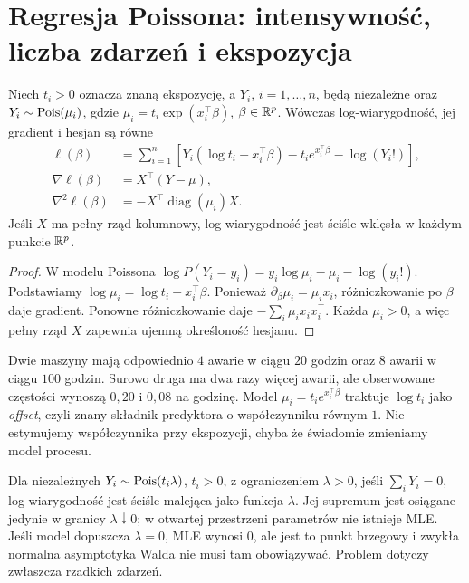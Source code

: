 \section{Regresja Poissona: intensywność, liczba zdarzeń i ekspozycja}
\begin{twierdzenie}
\label{thm:poisson-glm-score}
Niech $t_i>0$ oznacza znaną ekspozycję, a
$Y_i$, $i=1,\ldots,n$, będą niezależne oraz
$Y_i\sim\operatorname{Pois}(\mu_i)$, gdzie
$\mu_i=t_i\exp(x_i^\top\beta)$, $\beta\in\mathbb R^p$.
Wówczas log-wiarygodność, jej gradient i hesjan są równe
\[
 \begin{aligned}
 \ell(\beta)&=\sum_{i=1}^n
 [Y_i(\log t_i+x_i^\top\beta)
      -t_i e^{x_i^\top\beta}-\log(Y_i!)],\\
 \nabla\ell(\beta)&=X^\top(Y-\mu),\\
 \nabla^2\ell(\beta)&=-X^\top\operatorname{diag}(\mu_i)X.
 \end{aligned}
\]
Jeśli $X$ ma pełny rząd kolumnowy, log-wiarygodność
jest ściśle wklęsła w każdym punkcie $\mathbb R^p$.
\end{twierdzenie}
\begin{proof}
W modelu Poissona
$\log P(Y_i=y_i)=y_i\log\mu_i-\mu_i-\log(y_i!)$.
Podstawiamy $\log\mu_i=\log t_i+x_i^\top\beta$.
Ponieważ $\partial_\beta\mu_i=\mu_ix_i$,
różniczkowanie po $\beta$ daje gradient.
Ponowne różniczkowanie daje
$-\sum_i\mu_ix_ix_i^\top$.
Każda $\mu_i>0$, a więc pełny rząd $X$ zapewnia
ujemną określoność hesjanu.
\end{proof}

\begin{przyklad}
Dwie maszyny mają odpowiednio $4$ awarie w ciągu
$20$ godzin oraz $8$ awarii w ciągu $100$ godzin.
Surowo druga ma dwa razy więcej awarii, ale
obserwowane częstości wynoszą $0{,}20$ i $0{,}08$
na godzinę. Model $\mu_i=t_i e^{x_i^\top\beta}$
traktuje $\log t_i$ jako \emph{offset}, czyli
znany składnik predyktora o współczynniku równym $1$.
Nie estymujemy współczynnika przy ekspozycji,
chyba że świadomie zmieniamy model procesu.
\end{przyklad}

\begin{uwaga}
Dla niezależnych $Y_i\sim\operatorname{Pois}(t_i\lambda)$,
$t_i>0$, z ograniczeniem $\lambda>0$, jeśli
$\sum_iY_i=0$, log-wiarygodność jest ściśle
malejąca jako funkcja $\lambda$. Jej supremum jest
osiągane jedynie w granicy $\lambda\downarrow0$;
w otwartej przestrzeni parametrów nie istnieje MLE.
Jeśli model dopuszcza $\lambda=0$, MLE wynosi $0$,
ale jest to punkt brzegowy i zwykła normalna asymptotyka
Walda nie musi tam obowiązywać. Problem dotyczy
zwłaszcza rzadkich zdarzeń.
\end{uwaga}

